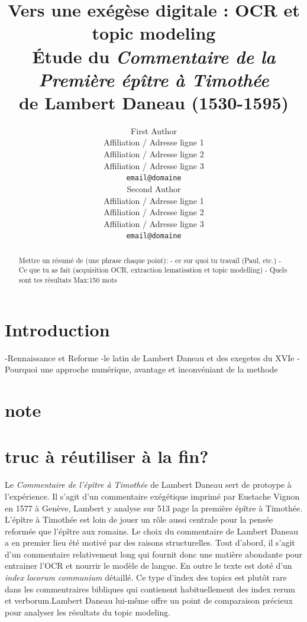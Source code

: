 \documentclass[11pt,french]{article}
\title{Vers une exégèse digitale : OCR et topic modeling \\ Étude du \textit{Commentaire de la Première épître à Timothée} \\ de Lambert Daneau (1530-1595)}
\author{First Author \\
  Affiliation / Adresse ligne 1 \\
  Affiliation / Adresse ligne 2 \\
  Affiliation / Adresse ligne 3 \\
  \texttt{email@domaine} \\\And
  Second Author \\
  Affiliation / Adresse ligne 1 \\
  Affiliation / Adresse ligne 2 \\
  Affiliation / Adresse ligne 3 \\
  \texttt{email@domaine} \\}
\begin{document}
\maketitle
\begin{abstract}
Mettre un résumé de (une phrase chaque point):
- ce sur quoi tu travail (Paul, etc.)
- Ce que tu as fait (acquisition OCR, extraction lematisation et topic modelling)
- Quels sont tes résultats
Max:150 mots
\end{abstract}

\section{Introduction}
-Rennaissance et Reforme 
-le latin de Lambert Daneau et des exegetes du XVIe
-Pourquoi une approche numérique, avantage et inconvéniant de la methode

\section{note}
\section{truc à réutiliser à la fin?}
Le \textit{Commentaire de l'épître à Timothée} de Lambert Daneau sert de protoype à l'expérience. Il s'agit d'un commentaire exégétique imprimé par Eustache Vignon en 1577 à Genève, Lambert y analyse sur 513 page  la première épître à Timothée. L'épître à Timothée est loin de jouer un rôle aussi centrale pour la pensée reformée que l'épître aux romains. Le choix du commentaire de Lambert Daneau a en premier lieu été motivé par des raisons structurelles. Tout d'abord, il s'agit d'un commentaire relativement long qui fournit donc une matière abondante pour entrainer l'OCR et nourrir le modèle de langue. En outre le texte est doté d'un \textit{index locorum communium} détaillé. Ce type d'index des topics est plutôt rare dans les commentraires bibliques qui contienent habituellement des index rerum et verborum.Lambert Daneau lui-même offre un point de comparaison précieux pour analyser les résultats du topic modeling.    
\end{document}
